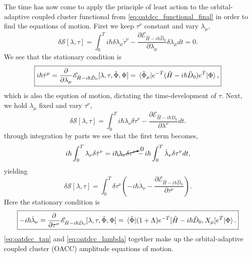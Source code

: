 The time has now come to apply the principle of least action to the orbital-adaptive 
coupled cluster functional from \autoref{eq:oatdcc_functional_final} in order to 
find the equations of motion. First we keep $\tau^\nu$ constant and vary $\lambda_\mu$,
\begin{equation}
    \delta\mathcal{S}[\lambda, \tau] 
    = \int_0^T i\hbar 
        \delta\lambda_\mu\dot{\tau}^\nu 
        - \frac{\partial \mathscr{E}_{\hat{H} - i\hbar \hat{D}_0}}{\partial \lambda_\mu} 
            \delta\lambda_\mu
    dt = 0.
\end{equation}
We see that the stationary condition is 
\begin{equation}
    \label{eq:oatdcc_tau}
    \boxed{
    i\hbar \dot{\tau}^\mu 
    = \frac{\partial}{\partial \lambda_\mu}
        \mathscr{E}_{\hat{H} -i \hbar \hat{D}_0}[\lambda, \tau, \tilde{\Phi}, \Phi]
    = \mel*{\tilde{\Phi}_\mu}
        {e^{-\hat{T}}(\hat{H} - i\hbar \hat{D}_0)e^{\hat{T}}}{\Phi},
    }
\end{equation}
which is also the eqution of motion, dictating the time-development of $\tau$. Next, 
we hold $\lambda_\mu$ fixed and vary $\tau^\nu$,
\begin{equation}
    \delta \mathcal{S}[\lambda, \tau]
    = \int_0^T
        i\hbar \lambda_\nu \delta \dot{\tau}^\nu
        - \frac{\partial \mathscr{E}_{\hat{H} - i\hbar\hat{D}_0}}{\partial \lambda^\nu} 
    dt. 
\end{equation}
through integration by parts we see that the first term becomes,
\begin{equation*}
    i\hbar\int_0^T \lambda_\nu \delta\dot{\tau}^\nu
    = i\hbar\cancelto{0}{\lambda_\nu\delta\tau^\nu}
    - i\hbar \int_0^T \dot{\lambda}_\nu \delta\tau^\nu dt,
\end{equation*}
yielding 
\begin{equation}
    \delta\mathcal{S}[\lambda, \tau] 
    = \int_0^T \delta \tau^\nu \left(-i\hbar\dot{\lambda}_\nu 
    -\frac{\partial \mathscr{E}_{\hat{H} - i\hbar\hat{D}_0}}{\partial\tau^\nu} \right).
\end{equation}
Here the stationary condition is 
\begin{equation}
    \label{eq:oatdcc_lambda}
    \boxed{
    -i\hbar\dot{\lambda}_\nu = \frac{\partial}{\partial \tau^\nu}
    \mathscr{E}_{\hat{H} - i\hbar\hat{D}_0}[\lambda, \tau, \tilde{\Phi}, \Phi]
    = \mel*{\tilde{\Phi}}
        {(1 + \Lambda)e^{-\hat{T}}[\hat{H} -i\hbar\hat{D}_0, X_\mu]e^{\hat{T}}
        }{\Phi}.
    }
\end{equation}
\autoref{eq:oatdcc_tau} and \autoref{eq:oatdcc_lambda} together make up the orbital-adaptive 
coupled cluster (OACC) amplitude equations of motion.

